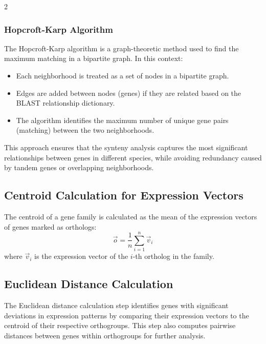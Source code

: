 2\documentclass{article}
\begin{document}
\subsubsection{Hopcroft-Karp Algorithm}
The Hopcroft-Karp algorithm is a graph-theoretic method used to find the maximum matching in a bipartite graph. In this context:
\begin{itemize}
    \item Each neighborhood is treated as a set of nodes in a bipartite graph.
    \item Edges are added between nodes (genes) if they are related based on the BLAST relationship dictionary.
    \item The algorithm identifies the maximum number of unique gene pairs (matching) between the two neighborhoods.
\end{itemize}

This approach ensures that the synteny analysis captures the most significant relationships between genes in different species, while avoiding redundancy caused by tandem genes or overlapping neighborhoods.

\subsection{Centroid Calculation for Expression Vectors}
The centroid of a gene family is calculated as the mean of the expression vectors of genes marked as orthologs:
\[
\vec{o} = \frac{1}{n} \sum_{i=1}^n \vec{v}_i
\]
where \( \vec{v}_i \) is the expression vector of the \( i \)-th ortholog in the family.

\subsection{Euclidean Distance Calculation}
The Euclidean distance calculation step identifies genes with significant deviations in expression patterns by comparing their expression vectors to the centroid of their respective orthogroups. This step also computes pairwise distances between genes within orthogroups for further analysis.
\end{document}
